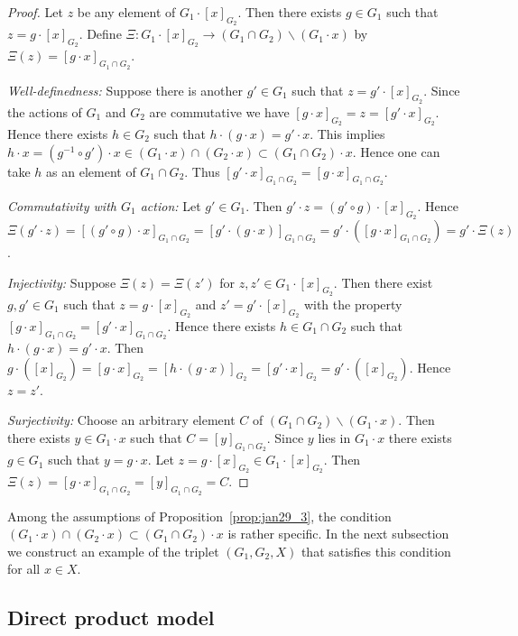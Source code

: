 \begin{proof}
Let $z$ be any element of $G_1 \cdot [x]_{G_2}$.
Then there exists $g \in G_1$ such that $z = g \cdot [x]_{G_2}$.
Def\/ine $\varXi: G_1 \cdot [x]_{G_2} \rightarrow (G_1 \cap G_2) \backslash (G_1 \cdot x)$
by $\varXi (z) = [g \cdot x]_{G_1 \cap G_2}$.

\textit{Well-definedness:} Suppose there is another $g' \in G_1$ such that $z = g' \cdot  [x]_{G_2}$.
Since the actions of $G_1$ and $G_2$ are commutative we have
$[g \cdot x]_{G_2} =z = [g' \cdot x]_{G_2}$.
Hence there exists $h \in G_2$ such that $h \cdot (g \cdot x) = g' \cdot x$.
This implies $h \cdot x = (g^{-1} \circ g') \cdot x \in (G_1 \cdot x) \cap (G_2 \cdot x) \subset (G_1 \cap G_2) \cdot x$.
Hence one can take $h$ as an element of $G_1 \cap G_2$.
Thus $[g' \cdot x]_{G_1 \cap G_2} = [g \cdot x]_{G_1 \cap G_2}$.

\textit{Commutativity with $G_1$ action:}
Let $g' \in G_1$.
Then $g' \cdot z = (g' \circ g) \cdot [x]_{G_2}$.
Hence $\varXi(g' \cdot z) = [(g' \circ g) \cdot x]_{G_1 \cap G_2} =
[ g' \cdot (g \cdot x)]_{G_1 \cap G_2} =
g' \cdot ([g \cdot x]_{G_1 \cap G_2}) = g' \cdot \varXi (z)$.

\textit{Injectivity:} Suppose $\varXi (z) = \varXi (z')$ for $z,z' \in G_1 \cdot [x]_{G_2}$.
Then there exist $g, g' \in G_1$ such that $z = g \cdot [x]_{G_2}$ and $z' = g' \cdot [x]_{G_2}$
with the property $[g \cdot x]_{G_1 \cap G_2} = [g' \cdot x]_{G_1 \cap G_2}$.
Hence there exists $h \in G_1 \cap G_2$ such that $h \cdot (g \cdot x) = g' \cdot x$.
Then $g \cdot ([x]_{G_2}) = [g \cdot x]_{G_2} = [h \cdot (g \cdot x)]_{G_2} = [g' \cdot x]_{G_2} = g' \cdot ([x]_{G_2})$.
Hence $z=z'$.

\textit{Surjectivity:} Choose an arbitrary element $C$ of $(G_1 \cap G_2) \backslash (G_1 \cdot x)$.
Then there exists $y \in G_1 \cdot x$ such that $C = [y]_{G_1 \cap G_2}$.
Since $y$ lies in $G_1 \cdot x$ there exists $g \in G_1$ such that $y = g \cdot x$.
Let $z = g \cdot [x]_{G_2} \in G_1 \cdot [x]_{G_2}$.
Then $\varXi (z) = [g \cdot x]_{G_1 \cap G_2} = [y]_{G_1 \cap G_2} =C$.
\end{proof}

Among the assumptions of Proposition~\ref{prop:jan29_3}, the condition $(G_1 \cdot x) \cap (G_2 \cdot x) \subset (G_1 \cap G_2) \cdot x$
is rather specif\/ic.
In the next subsection we construct an example of the triplet $(G_1,G_2,X)$ that satisf\/ies this condition for all $x \in X$.


\subsection{Direct product model}\label{subsec:2_2}

